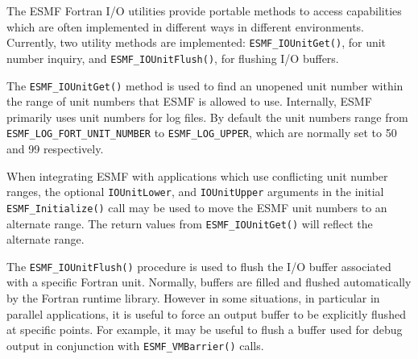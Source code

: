 
The ESMF Fortran I/O utilities provide portable methods to access
capabilities which are often implemented in different
ways in different environments.  Currently, two utility
methods are implemented: {\tt ESMF\_IOUnitGet()}, for unit
number inquiry, and {\tt ESMF\_IOUnitFlush()}, for flushing I/O
buffers.


The {\tt ESMF\_IOUnitGet()} method is used to find an unopened
unit number within the range of unit numbers that ESMF
is allowed to use.  Internally, ESMF primarily uses unit
numbers for log files.  By default the unit numbers range
from {\tt ESMF\_LOG\_FORT\_UNIT\_NUMBER} to {\tt ESMF\_LOG\_UPPER},
which are normally set to 50 and 99 respectively.


When integrating ESMF with applications which use conflicting
unit number ranges, the optional {\tt IOUnitLower}, and
{\tt IOUnitUpper} arguments in the initial {\tt ESMF\_Initialize()} call
may be used to move the ESMF unit numbers to an alternate range.
The return values from {\tt ESMF\_IOUnitGet()} will reflect the
alternate range.


The {\tt ESMF\_IOUnitFlush()} procedure is used to flush the
I/O buffer associated with a specific Fortran unit.  Normally,
buffers are filled and flushed automatically by the Fortran
runtime library.  However in some situations, in particular
in parallel applications, it is useful to force an output
buffer to be explicitly flushed at specific points.  For example,
it may be useful to flush a buffer used for debug output
in conjunction with {\tt ESMF\_VMBarrier()} calls.

